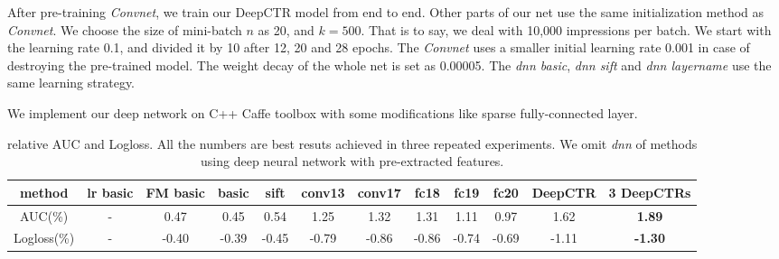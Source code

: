 \documentclass{sig-alternate}
\begin{document}
After pre-training  \emph{Convnet}, we train our DeepCTR model from end to end. Other parts of our net use the same  initialization method as  \emph{Convnet}. We choose the size of mini-batch $n$ as 20, and $k = 500$. That is to say, we deal with 10,000 impressions per batch.  We start with the learning rate 0.1, and divided it by 10 after 12, 20 and 28 epochs. The \emph{Convnet} uses a smaller initial learning rate 0.001 in case of destroying the pre-trained model. The weight decay of the whole net is set as 0.00005. The \emph{dnn basic}, \emph{dnn sift} and \emph{dnn layername} use the same learning strategy. 

We implement our deep network on C++ Caffe toolbox \cite{jia2014caffe} with some modifications like sparse fully-connected layer.
\begin{table}
	\centering
	\caption{relative AUC and Logloss. All the numbers are   best resuts achieved in three repeated experiments. We omit \emph{dnn} of methods using deep neural network with pre-extracted features.}
	\label{table:AUC}
	\begin{tabular}{|c|c c c c|c c c c c|c c|} \hline
		method  & lr basic &FM basic &  basic &sift &conv13 &conv17 &fc18 &fc19 &fc20 &DeepCTR &3 DeepCTRs \\  \hline
		AUC(\%) & -        &  0.47 & 0.45  &0.54 &  1.25 &1.32   &1.31 &1.11 &0.97 &1.62    &\textbf{1.89} \\  \hline
		Logloss(\%)&-      &  -0.40 & -0.39 &-0.45& -0.79 & -0.86 &-0.86&-0.74&-0.69&-1.11   & \textbf{-1.30}\\ \hline
	\end{tabular}
\end{table}
\end{document}
